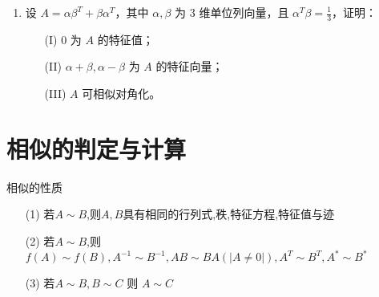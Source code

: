 \documentclass[12pt, a4paper, oneside, UTF8]{ctexbook}
\begin{document}
\begin{enumerate}
    \item 设 $A = \alpha \beta^T + \beta \alpha^T$，其中 $\alpha, \beta$ 为 3 维单位列向量，且 $\alpha^T \beta = \frac{1}{3}$，证明：
    \begin{enumerate}
        \item [(I)] 0 为 $A$ 的特征值；
        \item [(II)] $\alpha + \beta, \alpha - \beta$ 为 $A$ 的特征向量；
        \item [(III)] $A$ 可相似对角化。
    \end{enumerate}
    
    \begin{solution}
    \newpage
    \end{solution}
\end{enumerate}

\section{相似的判定与计算}
\begin{remark}
    相似的性质
    \begin{enumerate}
        \item [(1)] 若$A\sim B$,则$A,B$具有相同的行列式,秩,特征方程,特征值与迹
        \item [(2)] 若$A\sim B$,则$f(A)\sim f(B),A^{-1}\sim B^{-1}, AB\sim BA(\left|A\neq 0\right|),A^{T}\sim B^{T},A^{*}\sim B^{*}$ 
        \item [(3)] 若$A\sim B, B\sim C$ 则 $A\sim C$
    \end{enumerate}
\end{remark}
\end{document}
